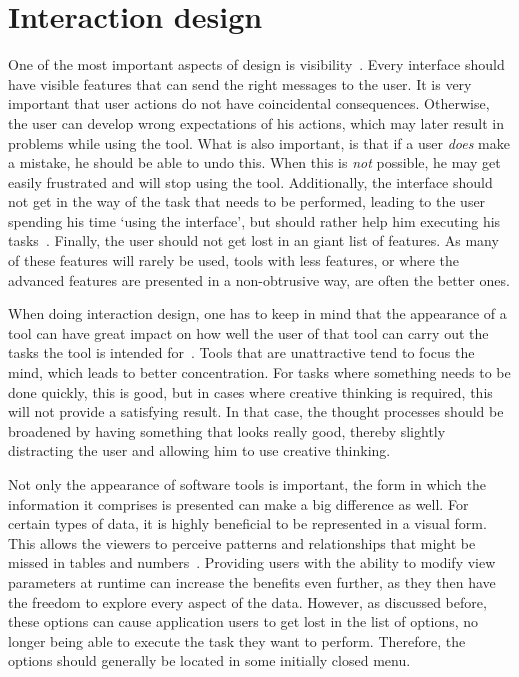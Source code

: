 \section{Interaction design}
One of the most important aspects of design is visibility~\cite{norman2002design}. Every interface should have visible features that can send the right messages to the user. It is very important that user actions do not have coincidental consequences. Otherwise, the user can develop wrong expectations of his actions, which may later result in problems while using the tool. What is also important, is that if a user \emph{does} make a mistake, he should be able to undo this. When this is \emph{not} possible, he may get easily frustrated and will stop using the tool. Additionally, the interface should not get in the way of the task that needs to be performed, leading to the user spending his time `using the interface', but should rather help him executing his tasks~\cite{norman1990interfaces}. Finally, the user should not get lost in an giant list of features. As many of these features will rarely be used, tools with less features, or where the advanced features are presented in a non-obtrusive way, are often the better ones.

When doing interaction design, one has to keep in mind that the appearance of a tool can have great impact on how well the user of that tool can carry out the tasks the tool is intended for~\cite{norman2002emotion}. Tools that are unattractive tend to focus the mind, which leads to better concentration. For tasks where something needs to be done quickly, this is good, but in cases where creative thinking is required, this will not provide a satisfying result. In that case, the thought processes should be broadened by having something that looks really good, thereby slightly distracting the user and allowing him to use creative thinking.

Not only the appearance of software tools is important, the form in which the information it comprises is presented can make a big difference as well. For certain types of data, it is highly beneficial to be represented in a visual form. This allows the viewers to perceive patterns and relationships that might be missed in tables and numbers~\cite{gallopoulos1994computer}. Providing users with the ability to modify view parameters at runtime can increase the benefits even further, as they then have the freedom to explore every aspect of the data. However, as discussed before, these options can cause application users to get lost in the list of options, no longer being able to execute the task they want to perform. Therefore, the options should generally be located in some initially closed menu.


